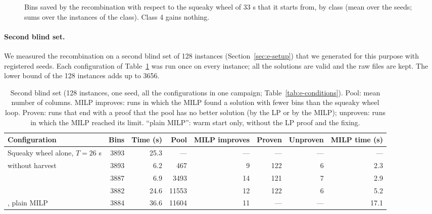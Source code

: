 \begin{figure}[t]
\centering
{}
\caption{Bins saved by the recombination with respect to the squeaky wheel of 33 s that it starts from, by class (mean over the seeds; sums over the
instances of the class). Class 4 gains nothing.}
\label{fig:e-class}
\end{figure}

\paragraph{Second blind set.}
We measured the recombination on a second blind set of 128 instances (Section~\ref{sec:e-setup}) that we generated for this purpose with registered seeds. Each configuration of
Table~\ref{tab:e-recomb} was run once on every instance; all the solutions are valid and the raw files are kept. The lower bound of the 128 instances adds up to 3656.

\begin{table}[t]
\centering
\small\setlength{\tabcolsep}{3.5pt}
\caption{Second blind set (128 instances, one seed, all the configurations in one campaign; Table~\ref{tab:e-conditions}). Pool: mean number of columns. MILP improves: runs in which the MILP found a solution with fewer bins than the squeaky wheel loop.
Proven: runs that end with a proof that the pool has no better solution (by the LP or by the MILP); unproven: runs in which the MILP reached its limit. ``plain MILP'': warm start only, without the
LP proof and the fixing.}
\label{tab:e-recomb}
\begin{tabular}{@{}lrrrrrrr@{}}
\toprule
Configuration & Bins & Time (s) & Pool & MILP improves & Proven & Unproven & MILP time (s)\\
\midrule
Squeaky wheel alone, $T=26$ s & 3893 & 25.3 & --- & --- & --- & --- & ---\\
\cfgfast{} without harvest & 3893 & 6.2 & 467 & 9 & 122 & 6 & 2.3\\
\cfgfast{} & 3887 & 6.9 & 3493 & 14 & 121 & 7 & 2.9\\
\cfgbal{} & 3882 & 24.6 & 11553 & 12 & 122 & 6 & 5.2\\
\cfgbal{}, plain MILP & 3884 & 36.6 & 11604 & 11 & --- & --- & 17.1\\
\bottomrule
\end{tabular}
\end{table}

